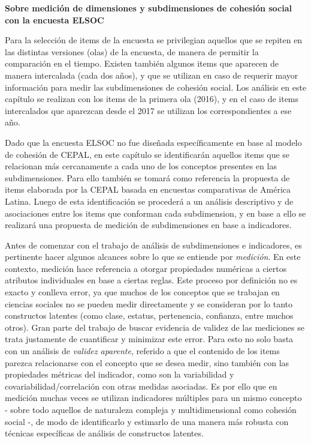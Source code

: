 \documentclass[
  12pt,
]{book}
\begin{document}
\textbf{Sobre medición de dimensiones y subdimensiones de cohesión social con la encuesta ELSOC}

Para la selección de items de la encuesta se privilegian aquellos que se repiten en las distintas versiones (olas) de la encuesta, de manera de permitir la comparación en el tiempo. Existen también algunos items que aparecen de manera intercalada (cada dos años), y que se utilizan en caso de requerir mayor información para medir las subdimensiones de cohesión social. Los análisis en este capítulo se realizan con los items de la primera ola (2016), y en el caso de items intercalados que aparezcan desde el 2017 se utilizan los correspondientes a ese año.

Dado que la encuesta ELSOC no fue diseñada específicamente en base al modelo de cohesión de CEPAL, en este capítulo se identificarán aquellos items que se relacionan más cercanamente a cada uno de los conceptos presentes en las subdimensiones. Para ello también se tomará como referencia la propuesta de items elaborada por la CEPAL basada en encuestas comparativas de América Latina. Luego de esta identificación se procederá a un análisis descriptivo y de asociaciones entre los items que conforman cada subdimension, y en base a ello se realizará una propuesta de medición de subdimensiones en base a indicadores.

Antes de comenzar con el trabajo de análisis de subdimensiones e indicadores, es pertinente hacer algunos alcances sobre lo que se entiende por \emph{medición}. En este contexto, medición hace referencia a otorgar propiedades numéricas a ciertos atributos individuales en base a ciertas reglas. Este proceso por definición no es exacto y conlleva error, ya que muchos de los conceptos que se trabajan en ciencias sociales no se pueden medir directamente y se consideran por lo tanto constructos latentes (como clase, estatus, pertenencia, confianza, entre muchos otros). Gran parte del trabajo de buscar evidencia de validez de las mediciones se trata justamente de cuantificar y minimizar este error. Para esto no solo basta con un análisis de \emph{validez aparente}, referido a que el contenido de los items parezca relacionarse con el concepto que se desea medir, sino también con las propiedades métricas del indicador, como son la variabilidad y covariabilidad/correlación con otras medidas asociadas. Es por ello que en medición muchas veces se utilizan indicadores múltiples para un mismo concepto - sobre todo aquellos de naturaleza compleja y multidimensional como cohesión social -, de modo de identificarlo y estimarlo de una manera más robusta con técnicas específicas de análisis de constructos latentes.
\end{document}
